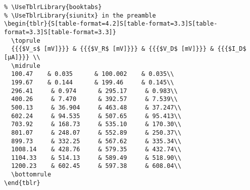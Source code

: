 \documentclass{beamer}
\begin{document}
\begin{frame}
  \framebreak
  \begin{lstlisting}
% \UseTblrLibrary{booktabs}
% \UseTblrLibrary{siunitx} in the preamble
\begin{tblr}{S[table-format=4.2]S[table-format=3.3]S[table-format=3.3]S[table-format=3.3]}
  \toprule
  {{{$V_s$ [mV]}}} & {{{$V_R$ [mV]}}} & {{{$V_D$ [mV]}}} & {{{$I_D$ [µA]}}} \\
  \midrule
  100.47    & 0.035      & 100.002    & 0.035\\
  199.67    & 0.144      & 199.46     & 0.145\\
  296.41     & 0.974      & 295.17     & 0.983\\
  400.26     & 7.470      & 392.57     & 7.539\\
  500.13     & 36.904     & 463.48     & 37.247\\
  602.24     & 94.535     & 507.65     & 95.413\\
  703.92     & 168.73     & 535.10     & 170.30\\
  801.07     & 248.07     & 552.89     & 250.37\\
  899.73     & 332.25     & 567.62     & 335.34\\
  1008.14    & 428.76     & 579.35     & 432.74\\
  1104.33    & 514.13     & 589.49     & 518.90\\
  1200.23    & 602.45     & 597.38     & 608.04\\
  \bottomrule
\end{tblr}
  \end{lstlisting}
\end{frame}



\end{document}
